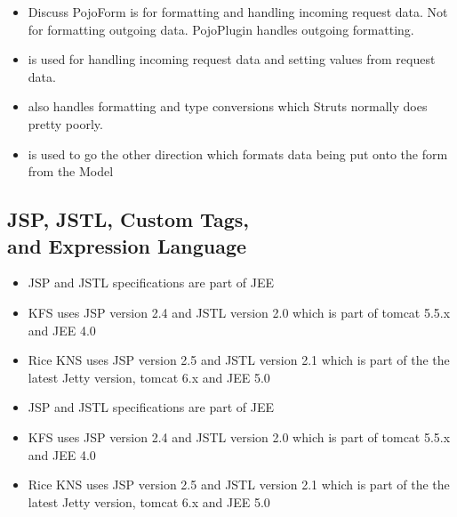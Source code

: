 \begin{ifhtml}
\begin{s5slide}
    \begin{s5notes}
      \begin{itemize}
      \item Discuss PojoForm is for formatting and handling incoming request data. Not for formatting outgoing data. PojoPlugin handles outgoing formatting.
      \item {} is used for handling incoming request data and setting  values from request data.
      \item {} also handles formatting and type conversions which Struts normally does pretty poorly.
      \item {} is used to go the other direction which formats data being put onto the form from the Model
      \end{itemize}
    \end{s5notes}
  \end{s5slide}
  
  \begin{s5slide}
    \section{JSP, JSTL, Custom Tags, \\ and Expression Language}
    \begin{itemize}
      \item JSP and JSTL specifications are part of JEE
      \item KFS uses JSP version 2.4 and JSTL version 2.0 which is part of tomcat 5.5.x and JEE 4.0
      \item Rice KNS uses JSP version 2.5 and JSTL version 2.1 which is part of the the latest Jetty version,
        tomcat 6.x and JEE 5.0
    \end{itemize}
  \end{s5slide}

  \begin{s5notes}
    \begin{itemize}
      \item JSP and JSTL specifications are part of JEE
      \item KFS uses JSP version 2.4 and JSTL version 2.0 which is part of tomcat 5.5.x and JEE 4.0
      \item Rice KNS uses JSP version 2.5 and JSTL version 2.1 which is part of the the latest Jetty version,
        tomcat 6.x and JEE 5.0
    \end{itemize}
  \end{s5notes}


\end{ifhtml}
